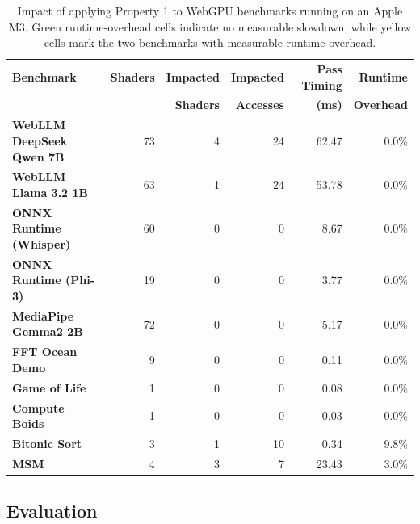\begin{table}
\fontsize{9.5}{11}\selectfont
\centering
\caption{Impact of applying \smsg Property 1 to WebGPU benchmarks running on an Apple M3. Green runtime-overhead cells indicate no measurable slowdown, while yellow cells mark the two benchmarks with measurable runtime overhead.}
\begingroup
{}
\begin{tabular}{l r r r r r}
\toprule
\textbf{Benchmark} & \textbf{Shaders} & \textbf{Impacted} & \textbf{Impacted} & \textbf{Pass Timing} & \textbf{Runtime}\\
& & \textbf{Shaders} & \textbf{Accesses} & \textbf{(ms)} & \textbf{Overhead} \\
\midrule
\textbf{WebLLM DeepSeek Qwen 7B~\cite{ruan2024webllmhighperformanceinbrowserllm}} & 73 & 4 & 24 & 62.47 & \cellcolor{green!15}0.0\% \\
\textbf{WebLLM Llama 3.2 1B~\cite{ruan2024webllmhighperformanceinbrowserllm}} & 63 & 1 & 24 & 53.78 & \cellcolor{green!15}0.0\% \\
\textbf{ONNX Runtime (Whisper)~\cite{whisperLargeV3TurboWebGPU}} & 60 & 0 & 0 & 8.67 & \cellcolor{green!15}0.0\% \\
\textbf{ONNX Runtime (Phi-3)~\cite{XenovaPhi3WebGPU}} & 19 & 0 & 0 & 3.77 & \cellcolor{green!15}0.0\% \\
\textbf{MediaPipe Gemma2 2B~\cite{mediapipeStudioLLM}} & 72 & 0 & 0 & 5.17 & \cellcolor{green!15}0.0\% \\
\textbf{FFT Ocean Demo~\cite{FFTOceanDemo}} & 9 & 0 & 0 & 0.11 & \cellcolor{green!15}0.0\% \\
\textbf{Game of Life~\cite{WebGPUSamples}} & 1 & 0 & 0 & 0.08 & \cellcolor{green!15}0.0\% \\
\textbf{Compute Boids~\cite{WebGPUSamples}} & 1 & 0 & 0 & 0.03 & \cellcolor{green!15}0.0\% \\
\textbf{Bitonic Sort~\cite{WebGPUSamples}} & 3 & 1 & 10 & 0.34 & \cellcolor{yellow!30}9.8\% \\
\textbf{MSM~\cite{DereiKohWebGPU_MSM_BLS12_2023}} & 4 & 3 & 7 & 23.43 & \cellcolor{yellow!30}3.0\% \\
\bottomrule
\end{tabular}
\endgroup

\label{tab:saferace-webgpu-benchmarks}
\end{table}


\subsection{Evaluation \label{sec:saferace-smsg-prop-1-eval}}

